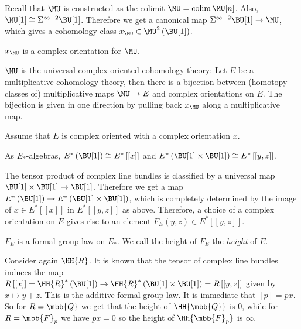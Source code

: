 \begin{example}
	Recall that $\MU$ is constructed as the colimit $\MU = \colim \MU[n]$.
	Also, $\MU[1] \cong \Sigma^{\infty-2} \BU[1]$.
	Therefore we get a canonical map $\Sigma^{\infty-2} \BU[1] \to \MU$, which gives a cohomology class $x_{\MU} \in \MU^2\left(\BU[1]\right)$.
\end{example}

\begin{proposition}
	$x_{\MU}$ is a complex orientation for $\MU$.
\end{proposition}

\begin{theorem}
	$\MU$ is the universal complex oriented cohomology theory:
	Let $E$ be a multiplicative cohomology theory, then there is a bijection between (homotopy classes of) multiplicative maps $\MU \to E$ and complex orientations on $E$.
	The bijection is given in one direction by pulling back $x_{\MU}$ along a multiplicative map.
\end{theorem}

Assume that $E$ is complex oriented with a complex orientation $x$.

\begin{theorem}
	As $E_*$-algebras,
	$E^*\left(\BU[1]\right) \cong E^*\left[\left[x\right]\right]$
	and
	$E^*\left(\BU[1] \times \BU[1]\right) \cong E^*\left[\left[y,z\right]\right]$.
\end{theorem}

The tensor product of complex line bundles is classified by a universal map $\BU[1] \times \BU[1] \to \BU[1]$.
Therefore we get a map $E^*\left(\BU[1]\right) \to E^*\left(\BU[1] \times \BU[1]\right)$, which is completely determined by the image of $x \in E^*\left[\left[x\right]\right]$ in $E^*\left[\left[y,z\right]\right]$ as above.
Therefore, a choice of a complex orientation on $E$ gives rise to an element $F_E\left(y,z\right) \in E^*\left[\left[y,z\right]\right]$.

\begin{proposition}
	$F_E$ is a formal group law on $E_*$.
	We call the height of $F_E$ the \emph{height} of $E$.
\end{proposition}

\begin{example}
	Consider again $\HH{R}$.
	It is known that the tensor of complex line bundles induces the map
	$
	R\left[\left[x\right]\right]
	= \HH{R}^*\left(\BU[1]\right)
	\to \HH{R}^*\left(\BU[1] \times \BU[1]\right)
	= R\left[\left[y,z\right]\right]
	$
	given by $x \mapsto y + z$.
	This is the additive formal group law.
	It is immediate that $\left[p\right] = p x$.
	So for $R = \mbb{Q}$ we get that the height of $\HH{\mbb{Q}}$ is 0, while for $R = \mbb{F}_p$ we have $p x = 0$ so the height of $\HH{\mbb{F}_p}$ is $\infty$.
\end{example}

